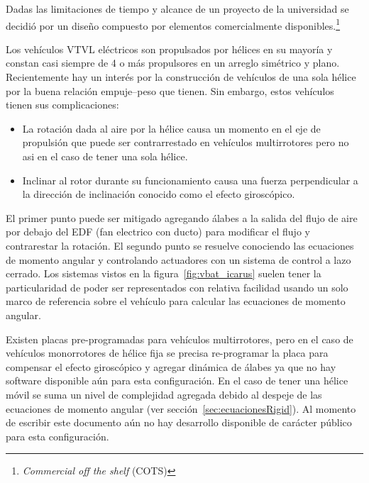 Dadas las limitaciones de tiempo y alcance de un proyecto de la universidad se decidió por un diseño compuesto por elementos comercialmente disponibles.\footnote{\textit{Commercial off the shelf} (COTS)}

\medskip

Los vehículos VTVL eléctricos son propulsados por hélices en su mayoría y constan casi siempre de 4 o más propulsores en un arreglo simétrico y plano. Recientemente hay un interés por la construcción de vehículos de una sola hélice por la buena relación empuje--peso que tienen. Sin embargo, estos vehículos tienen sus complicaciones: 

\begin{itemize}
    \item La rotación dada al aire por la hélice causa un momento en el eje de propulsión que puede ser contrarrestado en vehículos multirrotores pero no asi en el caso de tener una sola hélice.
    \item Inclinar al rotor durante su funcionamiento causa una fuerza perpendicular a la dirección de inclinación conocido como el efecto giroscópico. 
\end{itemize}

El primer punto puede ser mitigado agregando álabes a la salida del flujo de aire por debajo del EDF (fan electrico con ducto) para modificar el flujo y contrarestar la rotación. El segundo punto se resuelve conociendo las ecuaciones de momento angular y controlando actuadores con un sistema de control a lazo cerrado. Los sistemas vistos en la figura~\ref{fig:vbat_icarus} suelen tener la particularidad de poder ser representados con relativa facilidad usando un solo marco de referencia sobre el vehículo para calcular las ecuaciones de momento angular.

\medskip

Existen placas pre-programadas para vehículos multirrotores, pero en el caso de vehículos monorrotores de hélice fija se precisa re-programar la placa para compensar el efecto giroscópico y agregar dinámica de álabes ya que no hay software disponible aún para esta configuración. En el caso de tener una hélice móvil se suma un nivel de complejidad agregada debido al despeje de las ecuaciones de momento angular (ver sección~\ref{sec:ecuacionesRigid}). Al momento de escribir este documento aún no hay desarrollo disponible de carácter público para esta configuración.

